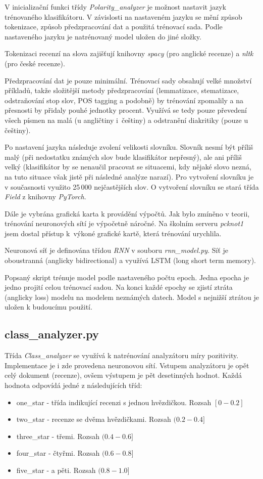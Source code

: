 V inicializační funkci třídy \emph{Polarity\_analyzer} je možnost nastavit jazyk trénovaného klasifikátoru. V závislosti na nastaveném jazyku se mění způsob tokenizace, způsob předzpracování dat a použitá trénovací sada. Podle nastaveného jazyku je natrénovaný model uložen do jiné složky.

Tokenizaci recenzí na slova zajišťují knihovny \emph{spacy} (pro anglické recenze) a \emph{nltk} (pro české recenze).

Předzpracování dat je pouze minimální. Trénovací sady obsahují velké množství příkladů, takže složitější metody předzpracování (lemmatizace, stematizace, odstraňování stop slov, POS tagging a podobně) by trénování zpomalily a na přesnosti by přidaly pouhé jednotky procent. Využívá se tedy pouze převedení všech písmen na malá (u angličtiny i~češtiny) a odstranění diakritiky (pouze u češtiny).


Po nastavení jazyka následuje zvolení velikosti slovníku. Slovník nesmí být příliš malý (při nedostatku známých slov bude klasifikátor nepřesný), ale ani příliš velký (klasifikátor by se nenaučil pracovat se situacemi, kdy nějaké slovo nezná, na tuto situace však jistě při následné analýze narazí). Pro vytvoření slovníku je v současnosti využito 25\,000 nejčastějších slov. O vytvoření slovníku se stará třída \emph{Field} z knihovny \emph{PyTorch}. 

Dále je vybrána grafická karta k provádění výpočtů. Jak bylo zmíněno v teorii, trénování neuronových sítí je výpočetně náročné. Na školním serveru \emph{pcknot1} jsem dostal přístup k~výkoné grafické kartě, která trénování urychlila. 

Neuronová síť je definována třídou \emph{RNN} v souboru \emph{rnn\_model.py}. Síť je oboustranná (anglicky bidirectional) a využívá LSTM (long short term memory).

Popsaný skript trénuje model podle nastaveného počtu epoch. Jedna epocha je jedno projití celou trénovací sadou. Na konci každé epochy se zjistí ztráta (anglicky loss) modelu na modelem neznámých datech. Model s nejnižší ztrátou je uložen k budoucímu použití.


\subsection{class\_analyzer.py}
Třída \emph{Class\_analyzer} se využívá k natrénování analyzátoru míry pozitivity. Implementace je i zde provedena neuronovou sítí. Vstupem analyzátoru je opět celý dokument (recenze), ovšem výstupem je pět desetinných hodnot. Každá hodnota odpovídá jedné z následujících tříd:
\begin{itemize}
  \item one\_star - třída indikující recenzi s jednou hvězdičkou. Rozsah $[0-0.2]$
  \item two\_star - recenze se dvěma hvězdičkami. Rozsah $(0.2-0.4]$
  \item three\_star - třemi. Rozsah $(0.4-0.6]$
  \item four\_star - čtyřmi. Rozsah $(0.6-0.8]$
  \item five\_star - a pěti. Rozsah $(0.8-1.0]$
\end{itemize}

